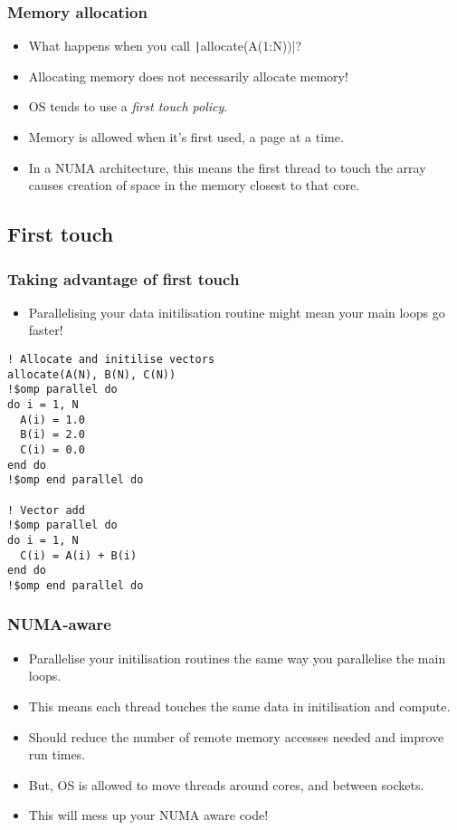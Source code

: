 \documentclass{beamer}
\begin{document}
\begin{frame}
\frametitle{Memory allocation}
\begin{itemize}
  \item What happens when you call \texttt|allocate(A(1:N))|?
  \pause
  \item Allocating memory does not necessarily allocate memory!
  \item OS tends to use a \emph{first touch policy}.
  \item Memory is allowed when it's first used, a page at a time.
  \item In a NUMA architecture, this means the first thread to touch the array causes creation of space in the memory closest to that core.
\end{itemize}
\end{frame}

\subsection{First touch}
\begin{frame}[fragile]
\frametitle{Taking advantage of first touch}
\begin{itemize}
  \item Parallelising your data initilisation routine might mean your main loops go faster!
\end{itemize}


\begin{verbatim}
! Allocate and initilise vectors
allocate(A(N), B(N), C(N))
!$omp parallel do
do i = 1, N
  A(i) = 1.0
  B(i) = 2.0
  C(i) = 0.0
end do
!$omp end parallel do

! Vector add
!$omp parallel do
do i = 1, N
  C(i) = A(i) + B(i)
end do
!$omp end parallel do
\end{verbatim}

\end{frame}

\begin{frame}
\frametitle{NUMA-aware}
\begin{itemize}
  \item Parallelise your initilisation routines the same way you parallelise the main loops.
  \item This means each thread touches the same data in initilisation and compute.
  \item Should reduce the number of remote memory accesses needed and improve run times.
  \item But, OS is allowed to move threads around cores, and between sockets.
  \item This will mess up your NUMA aware code!
\end{itemize}
\end{frame}
\end{document}
